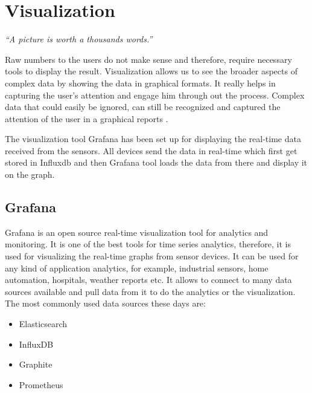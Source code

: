 \chapter{Visualization}


\makeatletter
\renewcommand{\@chapapp}{}%
\newenvironment{chapquote}[2][2em]
{\setlength{\@tempdima}{#1}%
	\def\chapquote@author{#2}%
	\parshape 1 \@tempdima \dimexpr{}\@tempdima\relax%
	\itshape}

\makeatother

\begin{center}
\begin{chapquote}{}
	``A picture is worth a thousands words.''
\end{chapquote}
\end{center}

Raw numbers to the users do not make sense and therefore, require necessary tools to display the result. Visualization allows us to see the broader aspects of complex data by showing the data in graphical formats. It really helps in capturing the user's attention and engage him through out the process. Complex data that could easily be ignored, can still be recognized and captured the attention of the user in a graphical reports \cite{quora:Sulakshana}.

The visualization tool Grafana has been set up for displaying the real-time data received from the sensors. All devices send the data in real-time which first get stored in Influxdb and then Grafana tool loads the data from there and display it on the graph. 

\section{Grafana}
Grafana is an open source real-time visualization tool for analytics and monitoring. It is one of the best tools for time series analytics, therefore, it is used for visualizing the real-time graphs from sensor devices. It can be used for any kind of application analytics, for example, industrial sensors, home automation, hospitals, weather reports etc. It allows to connect to many data sources available and pull data from it to do the analytics or the visualization. The most commonly used data sources these days are:

\begin{itemize}
	\item Elasticsearch
	\item InfluxDB
	\item Graphite
	\item Prometheus  
\end{itemize}

